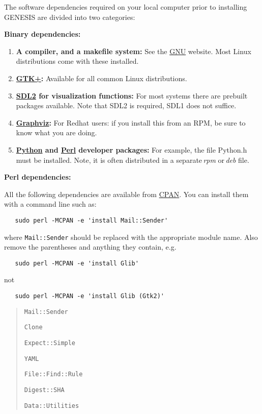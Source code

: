 \documentclass[12pt]{article}
\begin{document}
The software dependencies required on your local computer prior to installing GENESIS  are divided into two categories:
\begin{enumerate}
\item {\bf Binary dependencies:}
\begin{enumerate}
\item {\bf A compiler, and a makefile system:} See the \href{http://www.gnu.org/}{GNU} website. Most Linux distributions come with these installed.
\item {\bf \href{http://www.gtk.org/}{GTK+}:} Available for all common Linux distributions.
\item {\bf \href{http://simpledirectorylisting.net/}{SDL2} for visualization functions:} For most systems there are prebuilt packages available. Note that SDL2 is required, SDL1 does not suffice.
\item {\bf \href{httP://www.graphviz.org}{Graphviz}:} For Redhat users: if you install this from an RPM, be sure to know what you are doing.
\item {\bf  \href{http://www.python.org/}{Python} and  \href{http://www.perl.org/}{Perl} developer packages:} For example, the file Python.h must be installed. Note, it is often distributed in a separate\,{\it rpm} or\,{\it deb} file. 
\end{enumerate}

\item {\bf Perl dependencies:}

All the following dependencies are available from \href{http://search.cpan.org/}{CPAN}. You can install them with a command line such as:
\begin{verbatim}
   sudo perl -MCPAN -e 'install Mail::Sender'
\end{verbatim}
where {\tt Mail::Sender} should be replaced with the appropriate module name. Also remove the parentheses and anything they contain, e.g.
\begin{verbatim}
   sudo perl -MCPAN -e 'install Glib'
\end{verbatim}
not
\begin{verbatim}
   sudo perl -MCPAN -e 'install Glib (Gtk2)'
\end{verbatim}

\begin{quote}
\item {\tt Mail::Sender}
\item {\tt Clone}
\item {\tt Expect::Simple}
\item {\tt YAML}
\item {\tt File::Find::Rule}
\item {\tt Digest::SHA}
\item {\tt Data::Utilities} 


\end{quote}
\end{enumerate}
\end{document}
